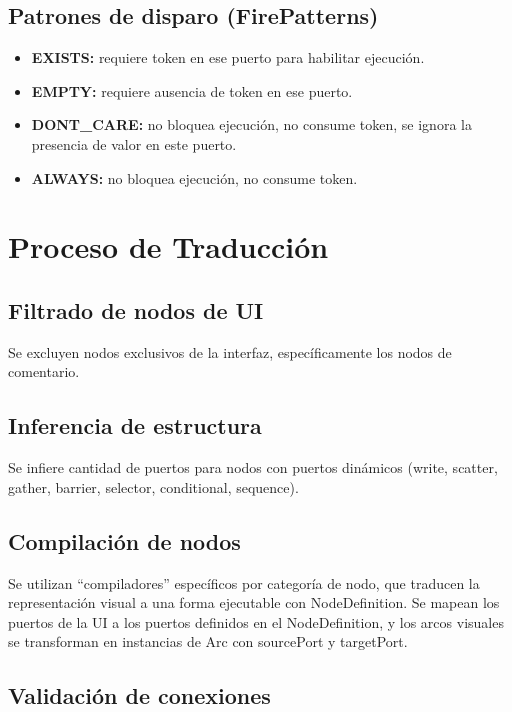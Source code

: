 \subsection*{Patrones de disparo (FirePatterns)}

\begin{itemize}
    \item \textbf{EXISTS:} requiere token en ese puerto para habilitar ejecución.
    \item \textbf{EMPTY:} requiere ausencia de token en ese puerto.
    \item \textbf{DONT\_CARE:} no bloquea ejecución, no consume token, se ignora la presencia de valor en este puerto.
    \item \textbf{ALWAYS:} no bloquea ejecución, no consume token.
\end{itemize}

\section*{Proceso de Traducción}

\subsection*{Filtrado de nodos de UI}

Se excluyen nodos exclusivos de la interfaz, específicamente los nodos de comentario.

\subsection*{Inferencia de estructura}

Se infiere cantidad de puertos para nodos con puertos dinámicos (write, scatter, gather, barrier, selector, conditional, sequence).

\subsection*{Compilación de nodos}

Se utilizan “compiladores” específicos por categoría de nodo, que traducen la representación visual a una forma ejecutable con NodeDefinition. Se mapean los puertos de la UI a los puertos definidos en el NodeDefinition, y los arcos visuales se transforman en instancias de Arc con sourcePort y targetPort.

\subsection*{Validación de conexiones}

